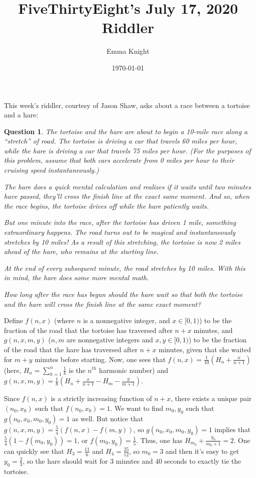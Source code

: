 \documentclass[11pt]{article}
\title{FiveThirtyEight's July 17, 2020 Riddler}
\author{Emma Knight}
\date{\today}
\newtheorem{question}[theorem]{Question}
\theoremstyle{definition}
\begin{document}
\maketitle
This week's riddler, courtesy of Jason Shaw, asks about a race between a tortoise and a hare:
\begin{question}
The tortoise and the hare are about to begin a 10-mile race along a ``stretch'' of road. The tortoise is driving a car that travels 60 miles per hour, while the hare is driving a car that travels 75 miles per hour. (For the purposes of this problem, assume that both cars accelerate from 0 miles per hour to their cruising speed instantaneously.)

The hare does a quick mental calculation and realizes if it waits until two minutes have passed, they’ll cross the finish line at the exact same moment. And so, when the race begins, the tortoise drives off while the hare patiently waits.

But one minute into the race, after the tortoise has driven 1 mile, something extraordinary happens. The road turns out to be magical and instantaneously stretches by 10 miles! As a result of this stretching, the tortoise is now 2 miles ahead of the hare, who remains at the starting line.

At the end of every subsequent minute, the road stretches by 10 miles. With this in mind, the hare does some more mental math.

How long after the race has begun should the hare wait so that both the tortoise and the hare will cross the finish line at the same exact moment?
\end{question}

Define $f(n, x)$ (where $n$ is a nonnegative integer, and $x \in [0, 1)$) to be the fraction of the road that the tortoise has traversed after $n + x$ minutes, and $g(n, x, m, y)$ ($n, m$ are nonnegative integers and $x, y \in [0,1)$) to be the fraction of the road that the hare has traversed after $n+x$ minutes, given that she waited for $m+y$ minutes before starting.  Now, one sees that $f(n, x) = \frac{1}{10}(H_n + \frac{x}{n+1})$ (here, $H_n = \sum_{k=1}^{n} \frac{1}{k}$ is the $n^{th}$ harmonic number) and $g(n, x, m, y) = \frac{1}{8}(H_n + \frac{x}{n+1} - H_m -\frac{y}{m+1})$.

Since $f(n, x)$ is a strictly increasing function of $n+x$, there exists a unique pair $(n_0, x_0)$ such that $f(n_0, x_0) = 1$.  We want to find $m_0, y_0$ such that $g(n_0, x_0, m_0, y_0) = 1$ as well.  But notice that $g(n, x, m, y) = \frac{5}{4}(f(n, x) - f(m, y))$, so $g(n_0, x_0, m_0, y_0) = 1$ implies that $\frac{5}{4}(1-f(m_0, y_0)) = 1$, or $f(m_0, y_0) = \frac{1}{5}$.  Thus, one has $H_{m_0} + \frac{y_0}{m_0+1} = 2$.  One can quickly see that $H_3 = \frac{11}{6}$ and $H_4 = \frac{25}{12}$, so $m_0 = 3$ and then it's easy to get $y_0 = \frac{2}{3}$, so the hare should wait for $3$ minutes and $40$ seconds to exactly tie the tortoise.
\end{document}
